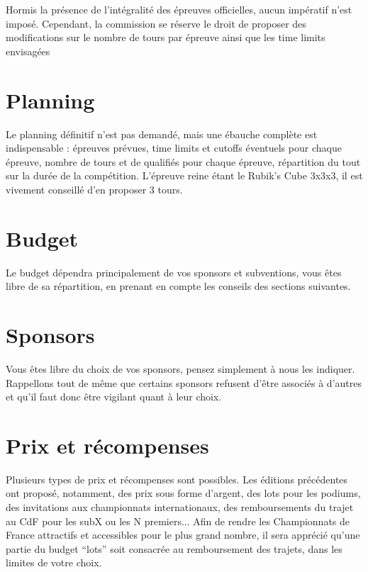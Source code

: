 \documentclass[a4paper,12pt]{scrartcl}
\begin{document}
Hormis la présence de l’intégralité des épreuves officielles, aucun impératif n’est imposé. Cependant, la commission se réserve le droit de proposer des modifications sur le nombre de tours par épreuve ainsi que les time limits envisagées




\section*{Planning}


Le planning définitif n’est pas demandé, mais une ébauche complète est indispensable : épreuves prévues, time limits et cutoffs éventuels pour chaque épreuve, nombre de tours et de qualifiés pour chaque épreuve, répartition du tout sur la durée de la compétition. L’épreuve reine étant le Rubik’s Cube 3x3x3, il est vivement conseillé d’en proposer 3 tours.




\section*{Budget}


Le budget dépendra principalement de vos sponsors et subventions, vous êtes libre de sa répartition, en prenant en compte les conseils des sections suivantes.


\section*{Sponsors}


Vous êtes libre du choix de vos sponsors, pensez simplement à nous les indiquer. Rappellons tout de même que certains sponsors refusent d’être associés à d’autres et qu’il faut donc être vigilant quant à leur choix.


\section*{Prix et récompenses}


Plusieurs types de prix et récompenses sont possibles. Les éditions précédentes ont proposé, notamment, des prix sous forme d’argent, des lots pour les podiums, des invitations aux championnats internationaux, des remboursements du trajet au CdF pour les subX ou les N premiers...
Afin de rendre les Championnats de France attractifs et accessibles pour le plus grand nombre, il sera apprécié qu’une partie du budget “lots” soit consacrée au remboursement des trajets, dans les limites de votre choix.
\end{document}
